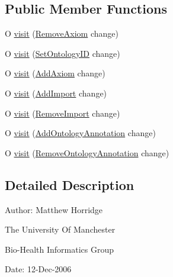 \subsection*{Public Member Functions}
\begin{DoxyCompactItemize}
\item 
O \hyperlink{classorg_1_1semanticweb_1_1owlapi_1_1util_1_1_o_w_l_ontology_change_visitor_adapter_ex_3_01_o_01_4_a5568833c2219a01d65ea64dbb338e3ce}{visit} (\hyperlink{classorg_1_1semanticweb_1_1owlapi_1_1model_1_1_remove_axiom}{Remove\-Axiom} change)
\item 
O \hyperlink{classorg_1_1semanticweb_1_1owlapi_1_1util_1_1_o_w_l_ontology_change_visitor_adapter_ex_3_01_o_01_4_a8e9e88c4458751073ea740f51a13dbe5}{visit} (\hyperlink{classorg_1_1semanticweb_1_1owlapi_1_1model_1_1_set_ontology_i_d}{Set\-Ontology\-I\-D} change)
\item 
O \hyperlink{classorg_1_1semanticweb_1_1owlapi_1_1util_1_1_o_w_l_ontology_change_visitor_adapter_ex_3_01_o_01_4_a28676436d1efcd8790f6fe9514d0104c}{visit} (\hyperlink{classorg_1_1semanticweb_1_1owlapi_1_1model_1_1_add_axiom}{Add\-Axiom} change)
\item 
O \hyperlink{classorg_1_1semanticweb_1_1owlapi_1_1util_1_1_o_w_l_ontology_change_visitor_adapter_ex_3_01_o_01_4_a4df444a0504ecb2f042a9d0799da36de}{visit} (\hyperlink{classorg_1_1semanticweb_1_1owlapi_1_1model_1_1_add_import}{Add\-Import} change)
\item 
O \hyperlink{classorg_1_1semanticweb_1_1owlapi_1_1util_1_1_o_w_l_ontology_change_visitor_adapter_ex_3_01_o_01_4_a007f6d53c0943366c3aa3508b0e90e74}{visit} (\hyperlink{classorg_1_1semanticweb_1_1owlapi_1_1model_1_1_remove_import}{Remove\-Import} change)
\item 
O \hyperlink{classorg_1_1semanticweb_1_1owlapi_1_1util_1_1_o_w_l_ontology_change_visitor_adapter_ex_3_01_o_01_4_a160b4b5e43446d40048dee0f35da172d}{visit} (\hyperlink{classorg_1_1semanticweb_1_1owlapi_1_1model_1_1_add_ontology_annotation}{Add\-Ontology\-Annotation} change)
\item 
O \hyperlink{classorg_1_1semanticweb_1_1owlapi_1_1util_1_1_o_w_l_ontology_change_visitor_adapter_ex_3_01_o_01_4_a2b5f9d484e68c578ec88a74cc6127594}{visit} (\hyperlink{classorg_1_1semanticweb_1_1owlapi_1_1model_1_1_remove_ontology_annotation}{Remove\-Ontology\-Annotation} change)
\end{DoxyCompactItemize}


\subsection{Detailed Description}
Author\-: Matthew Horridge\par
 The University Of Manchester\par
 Bio-\/\-Health Informatics Group\par
 Date\-: 12-\/\-Dec-\/2006\par
 \par



